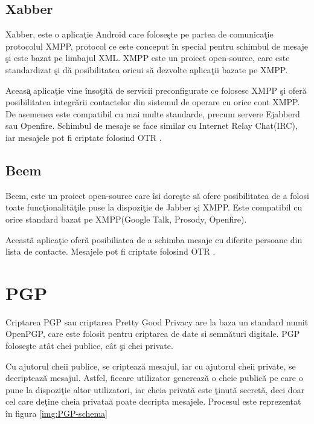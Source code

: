 \subsection{Xabber}

Xabber, este o aplica\c{t}ie Android care folose\c{s}te pe partea de comunica\c{t}ie protocolul XMPP, protocol ce este conceput \^{i}n special pentru schimbul de mesaje \c{s}i este bazat pe limbajul XML. XMPP este un proiect open-source, care este standardizat \c{s}i d\u{a} posibilitatea oricui s\u{a} dezvolte aplica\c{t}ii bazate pe XMPP.

Aceas\c{a} aplica\c{t}ie vine \^{i}nso\c{t}it\u{a} de servicii preconfigurate ce folosesc XMPP \c{s}i ofer\u{a} posibilitatea integr\u{a}rii contactelor din sistemul de operare cu orice cont XMPP. De asemenea este compatibil cu mai multe standarde, precum servere Ejabberd sau Openfire. Schimbul de mesaje se face similar cu Internet Relay Chat(IRC), iar mesajele pot fi criptate folosind OTR \cite{xabber}. 

\subsection{Beem}

Beem, este un proiect open-source care \^{i}si dore\c{s}te s\u{a} ofere posibilitatea de a folosi toate func\c{t}ionalit\u{a}\c{t}ile puse la dispozi\c{t}ie de Jabber \c{s}i XMPP. Este compatibil cu orice standard bazat pe XMPP(Google Talk, Prosody, Openfire).

Aceast\u{a} aplica\c{t}ie ofer\u{a} posibiliatea de a schimba mesaje cu diferite persoane din lista de contacte. Mesajele pot fi criptate folosind OTR \cite{beem}.

\section{PGP}

Criptarea PGP sau criptarea Pretty Good Privacy are la baza un standard numit OpenPGP, care este folosit pentru criptarea de date si semn\u{a}turi digitale. PGP folose\c{s}te at\^{a}t chei publice, c\^{a}t \c{s}i chei private.

	Cu ajutorul cheii publice, se cripteaz\u{a} mesajul, iar cu ajutorul cheii private, se decripteaz\u{a} mesajul. Astfel, fiecare utilizator genereaz\u{a} o cheie public\u{a} pe care o pune la dispozi\c{t}ie altor utilizatori, iar cheia privat\u{a} este \c{t}inut\u{a} secret\u{a}, deci doar cel care de\c{t}ine cheia privata\u{a} poate decripta mesajele. Procesul este reprezentat \^{i}n figura \ref{img:PGP-schema}

